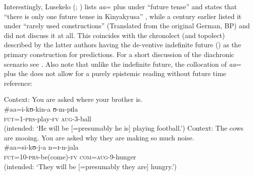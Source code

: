 Interestingly, Lusekelo (\citeyear{LusekeloA2007}; \citeyear{LusekeloA2013}) lists \textit{aa}= plus  under ``future tense'' and states that ``there is only one future tense in Kinyakyusa'' \citep[109]{LusekeloA2013}, while a century earlier \citet[32]{SchumannK1899} listed it under ``rarely used constructions'' (Translated from the original German, BP) and \citet{EndemannC1914} did not discuss it at all. This coincides with the chronolect (and topolect) described by the latter authors having the de-ventive indefinite future () as the primary construction for predictions. For a short discussion of the diachronic scenario see . Also note that unlike the indefinite future, the collocation of \textit{aa}= plus the  does not allow for a purely epistemic reading without future time reference:
\clearpage
\begin{exe}
\ex Context: You are asked where your brother is.\\
\gll \#aa=i-kʊ-kin-a ʊ-m-pɪla\\
\phantom{\#}\textsc{fut}=1-\textsc{prs}-play-\textsc{fv} \textsc{aug}-3-ball\\
\glt \makebox[\myl][l]{}(intended: \lq He will be [=presumably he is] playing football.')
\ex Context: The cows are mooing. You are asked why they are making so much noise.\\
\gll \#aa=si-kʊ-j-a n=ɪ-n-jala\\
\phantom{\#}\textsc{fut}=10-\textsc{prs}-be(come)-\textsc{fv} \textsc{com}=\textsc{aug}-9-hunger\\
\glt \makebox[\myl][l]{}(intended: \lq They will be [=presumably they are] hungry.')
\end{exe} %

